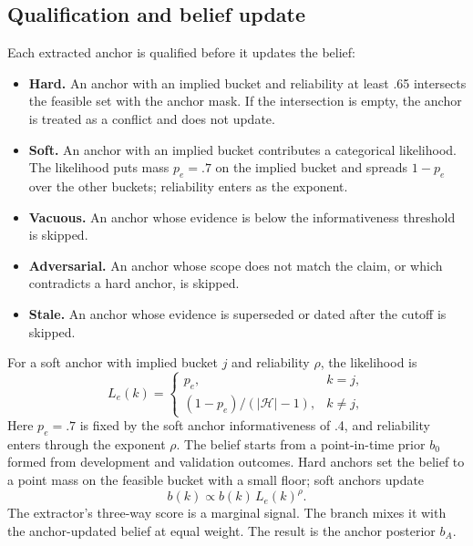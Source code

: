 \documentclass[11pt]{article}
\begin{document}
\subsection{Qualification and belief update}
Each extracted anchor is qualified before it updates the belief:
\begin{itemize}[leftmargin=*,itemsep=1pt,topsep=2pt]
\item \textbf{Hard.} An anchor with an implied bucket and reliability at least .65 intersects the feasible set with the anchor mask. If the intersection is empty, the anchor is treated as a conflict and does not update.
\item \textbf{Soft.} An anchor with an implied bucket contributes a categorical likelihood. The likelihood puts mass $p_e=.7$ on the implied bucket and spreads $1-p_e$ over the other buckets; reliability enters as the exponent.
\item \textbf{Vacuous.} An anchor whose evidence is below the informativeness threshold is skipped.
\item \textbf{Adversarial.} An anchor whose scope does not match the claim, or which contradicts a hard anchor, is skipped.
\item \textbf{Stale.} An anchor whose evidence is superseded or dated after the cutoff is skipped.
\end{itemize}
For a soft anchor with implied bucket $j$ and reliability $\rho$, the likelihood is
\begin{equation}
L_e(k)=
\begin{cases}
p_e, & k=j,\\
(1-p_e)/(|\mathcal H|-1), & k\ne j,
\end{cases}
\end{equation}
Here $p_e=.7$ is fixed by the soft anchor informativeness of .4, and reliability enters through the exponent $\rho$.
The belief starts from a point-in-time prior $b_0$ formed from development and validation outcomes. Hard anchors set the belief to a point mass on the feasible bucket with a small floor; soft anchors update
\begin{equation}
b(k)\propto b(k)\,L_e(k)^{\rho}.
\end{equation}
The extractor's three-way score is a marginal signal. The branch mixes it with the anchor-updated belief at equal weight. The result is the anchor posterior $b_A$.
\end{document}
